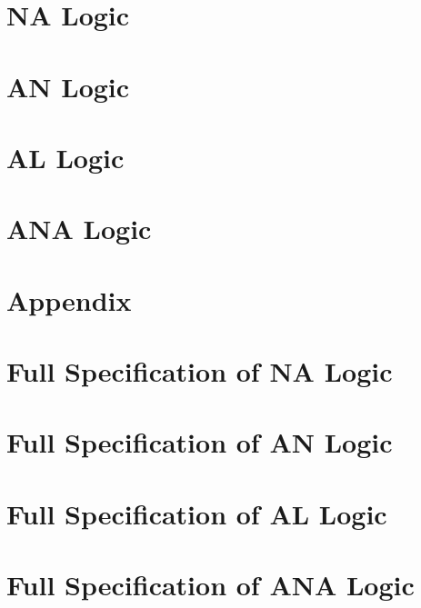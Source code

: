 \documentclass[11pt]{article}
\begin{document}
\section{NA Logic}
\label{sec:na_logic}


\section{AN Logic}
\label{sec:an_logic}


\section{AL Logic}
\label{sec:al_logic}


\section{ANA Logic}
\label{sec:ana_logic}


\appendix

\section*{Appendix}
\label{sec:appendix}

\section{Full Specification of NA Logic}
\label{sec:full_specification_na_logic}
\NAall

\section{Full Specification of AN Logic}
\label{sec:full_specification_an_logic}
\ANall

\section{Full Specification of AL Logic}
\label{sec:full_specification_al_logic}
\ALall

\section{Full Specification of ANA Logic}
\label{sec:full_specification_ana_logic}
\ANAall
\end{document}
